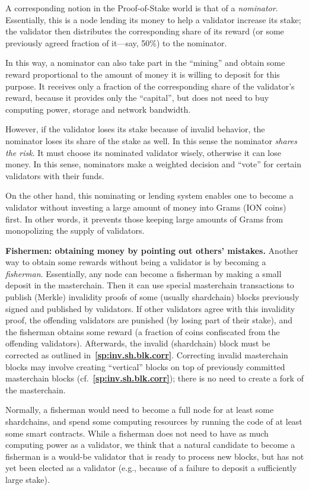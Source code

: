 \documentclass[12pt,oneside]{article}
\def\makepoint#1{\medbreak\noindent{\bf #1.\ }}
\def\nxsubpoint{\refstepcounter{subsubsection}%
  \smallbreak\makepoint{\thesubsubsection}}
\def\refpoint#1{{\rm\textbf{\ref{#1}}}}
\let\ptref=\refpoint
\def\embt(#1.){\textbf{#1.}}
\begin{document}
A corresponding notion in the Proof-of-Stake world is that of a {\em
  nominator}. Essentially, this is a node lending its money to help a
validator increase its stake; the validator then distributes the
corresponding share of its reward (or some previously agreed fraction
of it---say, 50\%) to the nominator.

In this way, a nominator can also take part in the ``mining'' and
obtain some reward proportional to the amount of money it is willing
to deposit for this purpose. It receives only a fraction of the
corresponding share of the validator's reward, because it provides
only the ``capital'', but does not need to buy computing power,
storage and network bandwidth.

However, if the validator loses its stake because of invalid behavior,
the nominator loses its share of the stake as well. In this sense the
nominator {\em shares the risk}. It must choose its nominated
validator wisely, otherwise it can lose money. In this sense,
nominators make a weighted decision and ``vote'' for certain
validators with their funds.

On the other hand, this nominating or lending system enables one to
become a validator without investing a large amount of money into
Grams (ION coins) first. In other words, it prevents those keeping
large amounts of Grams from monopolizing the supply of validators.

\nxsubpoint\label{sp:fish} \embt(Fishermen: obtaining money by
pointing out others' mistakes.)  Another way to obtain some rewards
without being a validator is by becoming a {\em
  fisherman}. Essentially, any node can become a fisherman by making a
small deposit in the masterchain. Then it can use special masterchain
transactions to publish (Merkle) invalidity proofs of some (usually
shardchain) blocks previously signed and published by validators. If
other validators agree with this invalidity proof, the offending
validators are punished (by losing part of their stake), and the
fisherman obtains some reward (a fraction of coins confiscated from
the offending validators). Afterwards, the invalid (shardchain) block
must be corrected as outlined
in~\ptref{sp:inv.sh.blk.corr}. Correcting invalid masterchain blocks
may involve creating ``vertical'' blocks on top of previously
committed masterchain blocks (cf.~\ptref{sp:inv.sh.blk.corr}); there
is no need to create a fork of the masterchain.

Normally, a fisherman would need to become a full node for at least
some shardchains, and spend some computing resources by running the
code of at least some smart contracts. While a fisherman does not need
to have as much computing power as a validator, we think that a
natural candidate to become a fisherman is a would-be validator that
is ready to process new blocks, but has not yet been elected as a
validator (e.g., because of a failure to deposit a sufficiently large
stake).
\end{document}
